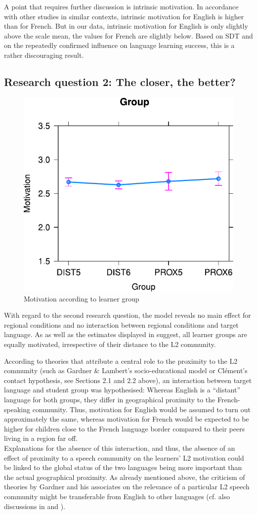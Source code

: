 \documentclass[output=paper]{langsci/langscibook}
\begin{document}
A point that requires further discussion is intrinsic motivation. In accordance with other studies in similar contexts, intrinsic motivation for English is higher than for French. But in our data, intrinsic motivation for English is only slightly above the scale mean, the values for French are slightly below. Based on  SDT and on the repeatedly confirmed influence on language learning success, this is a rather discouraging result.

\subsection{Research question 2: The closer, the better?}\label{sec:07:5.2}

  
\begin{figure}
\includegraphics[width=.5\textwidth]{figures/Fig7.2.pdf}
\caption{Motivation according to learner group\label{fig:07:2}}
\end{figure}

With regard to the second research question, the model reveals no main effect for regional conditions and no interaction between regional conditions and target language. As  as well as the estimates displayed in  suggest, all learner groups are equally motivated, irrespective of their distance to the L2 community.

According to theories that attribute a central role to the proximity to the L2 community (such as Gardner \& Lambert's socio-educational model or Clément's contact hypothesis, see Sections 2.1 and 2.2 above), an interaction between target language and student group was hypothesised: Whereas English is a ``distant'' language for both groups, they differ in geographical proximity to the French-speaking community. Thus, motivation for English would be assumed to turn out approximately the same, whereas motivation for French would be expected to be higher for children close to the French language border compared to their peers living in a region far off. \\
Explanations for the absence of this interaction, and thus, the absence of an effect of proximity to a speech community on the learners’ L2 motivation could be linked to the global status of the two languages being more important than the actual geographical proximity. As already mentioned above, the criticism of theories by Gardner and his associates on the relevance of a particular L2 speech community might be transferable from English to other languages (cf. also discussions in \citealt{Busse2017} and \citealt{Ushioda2017}).
\end{document}
